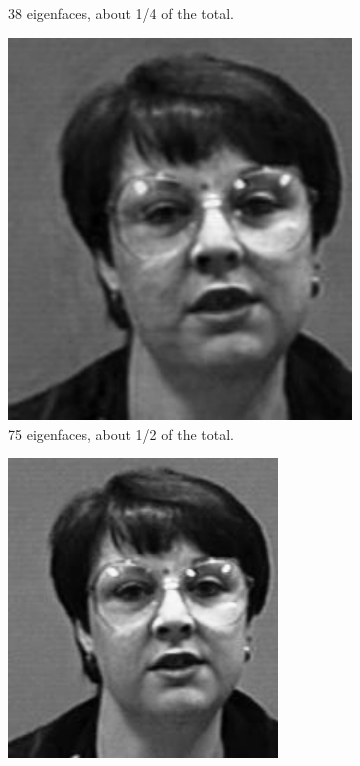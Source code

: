 \begin{figure}
\begin{subfigure}[b]{0.3\textwidth}
    \caption{38 eigenfaces, about 1/4 of the total.}
    \label{fig:38_efaces}
\end{subfigure}
\begin{subfigure}[b]{0.3\textwidth}
    \includegraphics[width=\textwidth]{figures/rebuiltHalf.pdf}
    \caption{75 eigenfaces, about 1/2 of the total.}
    \label{fig:75_efaces}
\end{subfigure}
\begin{subfigure}[b]{0.3\textwidth}
    \includegraphics[width=\textwidth]{figures/rebuiltAll.pdf}

\end{subfigure}
\end{figure}
